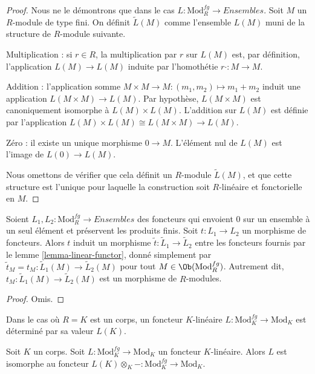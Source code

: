 \begin{proof}
Nous ne le démontrons que dans le cas
$L: \text{Mod}^{fg}_R \to \textit{Ensembles}$. Soit $M$ un $R$-module de type
fini. On définit $\widetilde{L}(M)$ comme l'ensemble $L(M)$ muni de la
structure de $R$-module suivante.

\medskip\noindent
Multiplication : si $r \in R$, la multiplication par $r$ sur $L(M)$ est, par
définition, l'application $L(M) \to L(M)$ induite par l'homothétie
$r \cdot : M \to M$.

\medskip\noindent
Addition : l'application somme $M \times M \to M: (m_1, m_2) \mapsto m_1 + m_2$
induit une application
$L(M \times M) \to L(M)$. Par hypothèse, $L(M \times M)$ est canoniquement
isomorphe à $L(M) \times L(M)$. L'addition sur $L(M)$ est définie par
l'application $L(M) \times L(M) \cong L(M \times M) \to L(M)$.

\medskip\noindent
Zéro : il existe un unique morphisme $0 \to M$. L'élément nul de $L(M)$
est l'image de $L(0) \to L(M)$.

\medskip\noindent
Nous omettons de vérifier que cela définit un $R$-module
$\widetilde{L}(M)$, et que cette structure est l'unique pour laquelle la
construction soit $R$-linéaire et fonctorielle en $M$.
\end{proof}

\begin{lemma}
\label{lemma-morphism-linear-functors}
Soient $L_1, L_2: \text{Mod}^{fg}_R \to \textit{Ensembles}$ des foncteurs qui
envoient $0$ sur un ensemble à un seul élément et préservent les produits finis. Soit
$t : L_1 \to L_2$ un morphisme de foncteurs. Alors $t$ induit un morphisme
$\widetilde{t} : \widetilde{L}_1 \to \widetilde{L}_2$ entre les foncteurs
fournis par le lemme \ref{lemma-linear-functor}, donné simplement par
$\widetilde{t}_M = t_M: \widetilde{L}_1(M) \to \widetilde{L}_2(M)$ pour tout
$M \in \Ob(\text{Mod}^{fg}_R)$. Autrement dit,
$t_M: \widetilde{L}_1(M) \to \widetilde{L}_2(M)$ est un morphisme de
$R$-modules.
\end{lemma}

\begin{proof}
Omis.
\end{proof}

\noindent
Dans le cas où $R = K$ est un corps, un foncteur $K$-linéaire
$L : \text{Mod}^{fg}_K \to \text{Mod}_K$ est déterminé par sa valeur $L(K)$.

\begin{lemma}
\label{lemma-linear-functor-over-field}
Soit $K$ un corps. Soit $L: \text{Mod}^{fg}_K \to
\text{Mod}_K$ un foncteur
$K$-linéaire. Alors $L$ est isomorphe au foncteur
$L(K) \otimes_K - : \text{Mod}^{fg}_K \to
\text{Mod}_K$.
\end{lemma}

